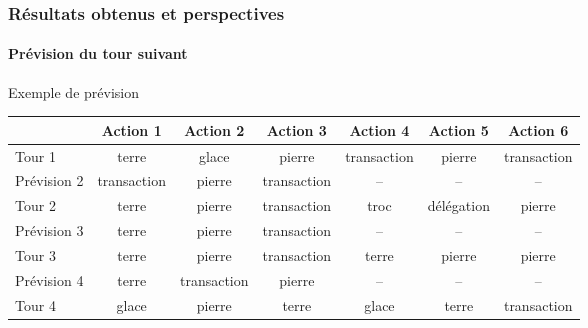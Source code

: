 \begin{frame}
	\frametitle{Résultats obtenus et perspectives}
	\framesubtitle{Prévision du tour suivant}
	Exemple de prévision
	\begin{table}
		\centering
		\tiny
		\begin{tabular}{l|c|c|c|c|c|c}
				   & Action 1 & Action 2 & Action 3 & Action 4 & Action 5 & Action 6 \\
			\hline
			Tour 1 & terre & glace & pierre & transaction & pierre & transaction \\
			Prévision 2 & transaction & pierre & transaction & -- & -- & -- \\
			Tour 2 & terre & pierre & transaction & troc & délégation & pierre \\
			Prévision 3 & terre & pierre & transaction & -- & -- & -- \\
			Tour 3 & terre & pierre & transaction & terre & pierre & pierre \\
			Prévision 4 & terre & transaction & pierre & -- & -- & -- \\
			Tour 4 & glace & pierre & terre & glace & terre & transaction \\
		\end{tabular}
	\end{table}
\end{frame}

